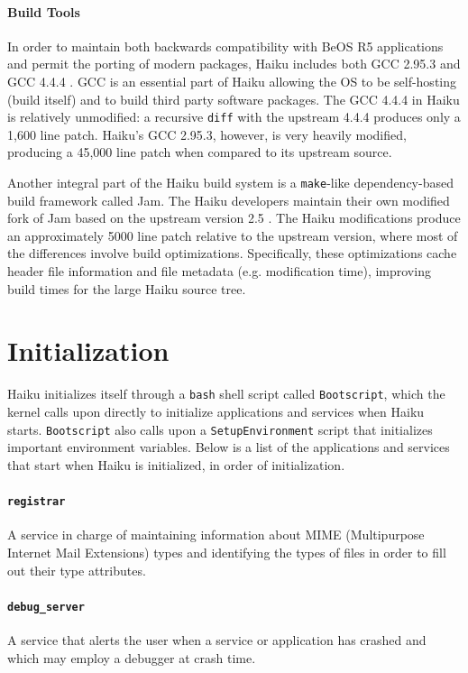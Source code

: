 \documentclass{article}
\begin{document}
\paragraph{Build Tools}
In order to maintain both backwards compatibility with BeOS R5
applications and permit the porting of modern packages, Haiku includes
both GCC 2.95.3 and GCC 4.4.4 \cite{GCCHybrids}.  GCC is an essential
part of Haiku allowing the OS to be self-hosting (build itself) and to
build third party software packages.  The GCC 4.4.4 in Haiku is
relatively unmodified: a recursive \texttt{diff} with the upstream
4.4.4 produces only a 1,600 line patch.  Haiku's GCC 2.95.3, however,
is very heavily modified, producing a 45,000 line patch when compared
to its upstream source.

Another integral part of the Haiku build system is a \texttt{make}-like
dependency-based build framework called Jam.  The Haiku developers
maintain their own modified fork of Jam based on the upstream version
2.5 \cite{UsingJam}.  The Haiku modifications produce an approximately
5000 line patch relative to the upstream version, where most of the
differences involve build optimizations.  Specifically, these
optimizations cache header file information and file metadata
(e.g. modification time), improving build times for the large Haiku
source tree.

\section{Initialization}

Haiku initializes itself through a \texttt{bash} shell script
called \texttt{Bootscript}, which the kernel calls upon directly to
initialize applications and services when Haiku
starts. \texttt{Bootscript} also calls upon
a \texttt{SetupEnvironment} script that initializes important
environment variables. Below is a list of the applications and
services that start when Haiku is initialized, in order of
initialization.

\paragraph{\texttt{registrar}}
A service in charge of maintaining information about MIME
(Multipurpose Internet Mail Extensions) types and identifying the
types of files in order to fill out their type
attributes. \cite{RegistrarInfo}

\paragraph{\texttt{debug\_server}}
A service that alerts the user when a service or application has
crashed and which may employ a debugger at crash
time. \cite{DebugServerLog}
\end{document}
